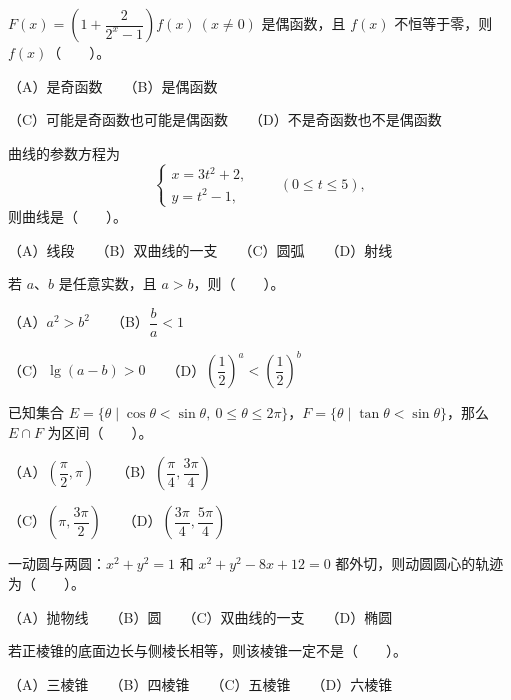 \begin{question}
$F(x)=\left(1+\dfrac{2}{2^x-1}\right)f(x)\ (x\ne0)$ 是偶函数，且 $f(x)$ 不恒等于零，则 $f(x)$\mbox{（　　）}。

（A）是奇函数　　（B）是偶函数

（C）可能是奇函数也可能是偶函数　　（D）不是奇函数也不是偶函数

\end{question}
\begin{question}
曲线的参数方程为
\nopagebreak[4]
\[
\begin{cases}
x=3t^2+2,\\
y=t^2-1,
\end{cases}\qquad (0\le t\le5),
\]
则曲线是\mbox{（　　）}。

（A）线段　　（B）双曲线的一支　　（C）圆弧　　（D）射线

\end{question}
\begin{question}
若 $a\text{、}b$ 是任意实数，且 $a>b$，则\mbox{（　　）}。

（A）$a^2>b^2$　　（B）$\dfrac ba<1$

（C）$\lg(a-b)>0$　　（D）$\left(\dfrac12\right)^a<\left(\dfrac12\right)^b$

\end{question}
\begin{question}
已知集合 $E=\{\theta\mid\cos\theta<\sin\theta,\ 0\le\theta\le2\pi\}$，$F=\{\theta\mid\tan\theta<\sin\theta\}$，那么 $E\cap F$ 为区间\mbox{（　　）}。

（A）$\left(\dfrac\pi2,\pi\right)$　　（B）$\left(\dfrac\pi4,\dfrac{3\pi}4\right)$

（C）$\left(\pi,\dfrac{3\pi}2\right)$　　（D）$\left(\dfrac{3\pi}4,\dfrac{5\pi}4\right)$

\end{question}
\begin{question}
一动圆与两圆：$x^2+y^2=1$ 和 $x^2+y^2-8x+12=0$ 都外切，则动圆圆心的轨迹为\mbox{（　　）}。

（A）抛物线　　（B）圆　　（C）双曲线的一支　　（D）椭圆

\end{question}
\begin{question}
若正棱锥的底面边长与侧棱长相等，则该棱锥一定不是\mbox{（　　）}。

（A）三棱锥　　（B）四棱锥　　（C）五棱锥　　（D）六棱锥

\end{question}
